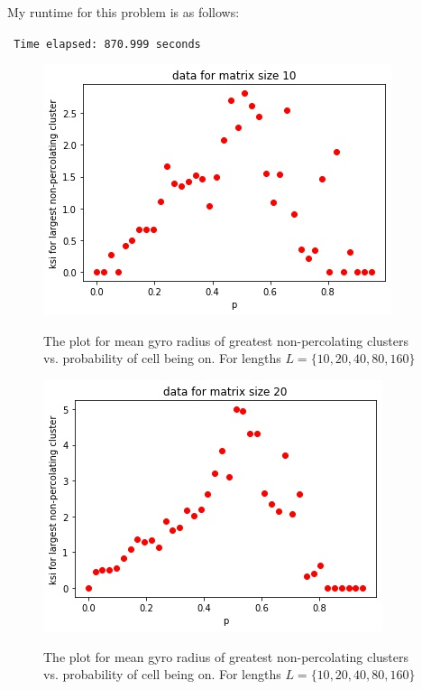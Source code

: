 \documentclass[12pt]{article}
\begin{document}
	My runtime for this problem is as follows:\\
	\centerline{\texttt{ Time elapsed: 870.999 seconds}}
	\begin{figure}[h!]
		\centering
		\includegraphics[width=0.9\linewidth]{../p5/fig0.jpg}
		\label{fig:gyroCluster}
		\caption{The plot for mean gyro radius  of greatest non-percolating clusters vs. probability of cell being on. For lengths $L = \{10, 20, 40, 80, 160\}$}
	\end{figure}
	\begin{figure}[h!]
	\centering
		\includegraphics[width=0.9\linewidth]{../p5/fig1.jpg}
	\label{fig:gyroCluste1}
	\caption{The plot for mean gyro radius  of greatest non-percolating clusters vs. probability of cell being on. For lengths $L = \{10, 20, 40, 80, 160\}$}
\end{figure}
\end{document}
